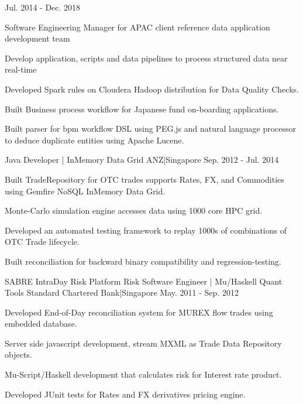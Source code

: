 \begin{cventries}
    {Jul. 2014 - Dec. 2018}
    {
      \begin{cvitems}
        \item {Software Engineering Manager for APAC client reference data application development team}
        \item {Develop application, scripts and data pipelines to process structured data near real-time}
        \item {Developed Spark rules on Cloudera Hadoop distribution for Data Quality Checks.}
        \item {Built Business process workflow for Japanese fund on-boarding applications.}
        \item {Built parser for bpm workflow DSL using PEG.js and natural language processor to deduce duplicate entities using Apache Lucene.}
      \end{cvitems}
    }
    {Java Developer | InMemory Data Grid}
    {ANZ|Singapore}
    {Sep. 2012 - Jul. 2014}
    {
      \begin{cvitems}
        \item {Built TradeRepository for OTC trades  supports Rates, FX, and Commodities using Gemfire NoSQL InMemory Data Grid.}
        \item {Monte-Carlo simulation engine accesses data using 1000 core HPC grid.}
        \item {Developed an automated testing framework to replay 1000s of combinations of OTC Trade lifecycle.}
        \item {Built reconciliation for backward binary compatibility and regression-testing.}
      \end{cvitems}
    }
  \cventry
    {SABRE IntraDay Risk Platform}
    {Risk Software Engineer | Mu/Haskell Quant Tools}
    {Standard Chartered Bank|Singapore}
    {May. 2011 - Sep. 2012}
    {
      \begin{cvitems}
        \item {Developed End-of-Day reconciliation system for MUREX flow trades using embedded database.}
        \item {Server side javascript development, stream MXML as Trade Data Repository objects.}
        \item {Mu-Script/Haskell development that calculates risk for Interest rate product.}
        \item {Developed JUnit tests for Rates and FX derivatives pricing engine.}
      \end{cvitems}
    }
  \cventry

\end{cventries}
